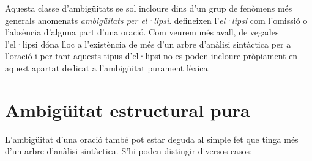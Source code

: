 \begin{enumerate}
  Aquesta classe d'ambigüitats se sol incloure dins d'un grup de
  fenòmens més generals anomenats \emph{ambigüitats per el·lipsi}.
  \citet{alcaraz97b} defineixen l'\emph{el·lipsi}\label{pg:ellipsi}
  com l'omissió o l'absència d'alguna part d'una oració. Com veurem
  més avall, de vegades l'el·lipsi dóna lloc a l'existència de més
  d'un arbre d'anàlisi sintàctica per a l'oració i per tant aquests
  tipus d'el·lipsi no es poden incloure pròpiament en aquest apartat
  dedicat a l'ambigüitat purament lèxica.

\end{enumerate} 

\section{Ambigüitat estructural pura}
\label{ss:ambest}
L'ambigüitat d'una oració també pot estar deguda al simple fet que
tinga més d'un arbre d'anàlisi sintàctica. S'hi poden distingir diversos
casos:
